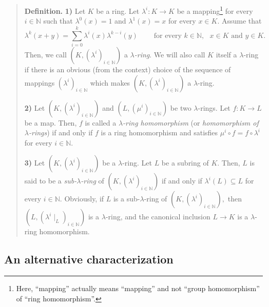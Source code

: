 \documentclass[numbers=enddot,12pt,final,onecolumn,notitlepage]{scrartcl}%
\begin{document}
\begin{quote}
\textbf{Definition.} \textbf{1)} Let $K$ be a ring. Let $\lambda
^{i}:K\rightarrow K$ be a mapping\footnote{Here, ``mapping'' actually means
``mapping'' and not ``group homomorphism'' of ``ring homomorphism''.} for every
$i\in\mathbb{N}$ such that $\lambda^{0}\left(  x\right)  =1$ and $\lambda
^{1}\left(  x\right)  =x$ for every $x\in K$. Assume that%
\begin{equation}
\lambda^{k}\left(  x+y\right)  =\sum_{i=0}^{k}\lambda^{i}\left(  x\right)
\lambda^{k-i}\left(  y\right)  \ \ \ \ \ \ \ \ \ \ \text{for every }%
k\in\mathbb{N},\text{ }x\in K\text{ and }y\in K. \label{lambda1}%
\end{equation}
Then, we call $\left(  K,\left(  \lambda^{i}\right)  _{i\in\mathbb{N}}\right)
$ a $\lambda$\textit{-ring}. We will also call $K$ itself a $\lambda$-ring if
there is an obvious (from the context) choice of the sequence of mappings
$\left(  \lambda^{i}\right)  _{i\in\mathbb{N}}$ which makes $\left(  K,\left(
\lambda^{i}\right)  _{i\in\mathbb{N}}\right)  $ a $\lambda$-ring.

\textbf{2)} Let $\left(  K,\left(  \lambda^{i}\right)  _{i\in\mathbb{N}%
}\right)  $ and $\left(  L,\left(  \mu^{i}\right)  _{i\in\mathbb{N}}\right)  $
be two $\lambda$-rings. Let $f:K\rightarrow L$ be a map. Then, $f$ is called a
$\lambda$\textit{-ring homomorphism} (or \textit{homomorphism of }$\lambda
$\textit{-rings}) if and only if $f$ is a ring homomorphism and satisfies
$\mu^{i}\circ f=f\circ\lambda^{i}$ for every $i\in\mathbb{N}$.

\textbf{3)} Let $\left(  K,\left(  \lambda^{i}\right)  _{i\in\mathbb{N}%
}\right)  $ be a $\lambda$-ring. Let $L$ be a subring of $K$. Then, $L$ is
said to be a \textit{sub-}$\lambda$\textit{-ring} of $\left(  K,\left(
\lambda^{i}\right)  _{i\in\mathbb{N}}\right)  $ if and only if $\lambda
^{i}\left(  L\right)  \subseteq L$ for every $i\in\mathbb{N}$. Obviously, if
$L$ is a sub-$\lambda$-ring of $\left(  K,\left(  \lambda^{i}\right)
_{i\in\mathbb{N}}\right)  ,$ then $\left(  L,\left(  \lambda^{i}\mid
_{L}\right)  _{i\in\mathbb{N}}\right)  $ is a $\lambda$-ring, and the
canonical inclusion $L\rightarrow K$ is a $\lambda$-ring homomorphism.
\end{quote}

\subsection{An alternative characterization}
\end{document}
